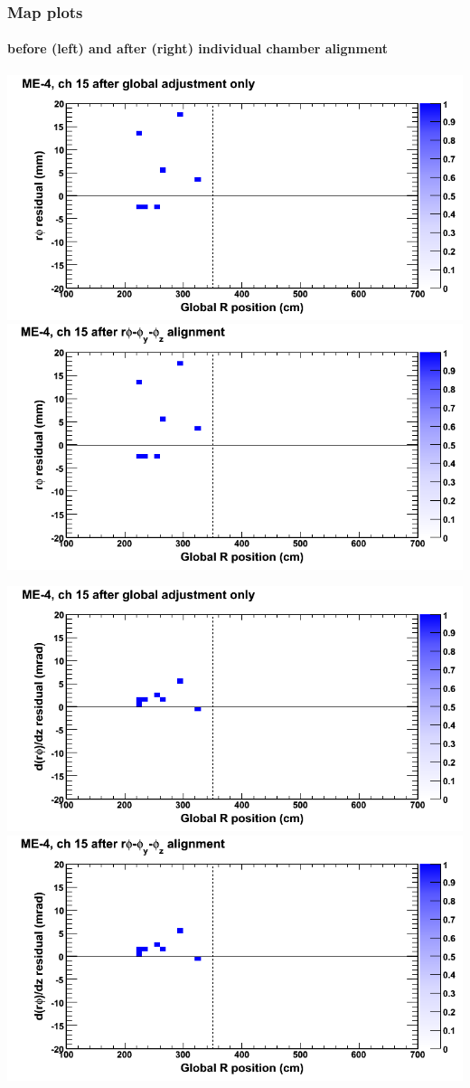 \documentclass[compress]{beamer}
\begin{document}
\begin{frame}
\frametitle{Map plots}
\framesubtitle{before (left) and after (right) individual chamber alignment}
\includegraphics[width=0.5\linewidth]{ringmapplots_3dof/before_CSCvsr_mem4ch15_x.png} \includegraphics[width=0.5\linewidth]{ringmapplots_3dof/after_CSCvsr_mem4ch15_x.png}

\includegraphics[width=0.5\linewidth]{ringmapplots_3dof/before_CSCvsr_mem4ch15_dxdz.png} \includegraphics[width=0.5\linewidth]{ringmapplots_3dof/after_CSCvsr_mem4ch15_dxdz.png}
\end{frame}
\end{document}
